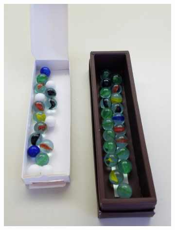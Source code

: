\documentclass{article}
\begin{document}
\begin{figure}[H]
\begin{subfigure}{.5\textwidth}
	\end{subfigure}
\end{figure}

\begin{figure}[H]
	\centering
	\begin{subfigure}{.5\textwidth}
		\centering
		\includegraphics[width=.9\linewidth,angle=-90]{photos/m3}
	\end{subfigure}%
	\begin{subfigure}{.5\textwidth}
		\centering

\end{subfigure}
\end{figure}
\end{document}
